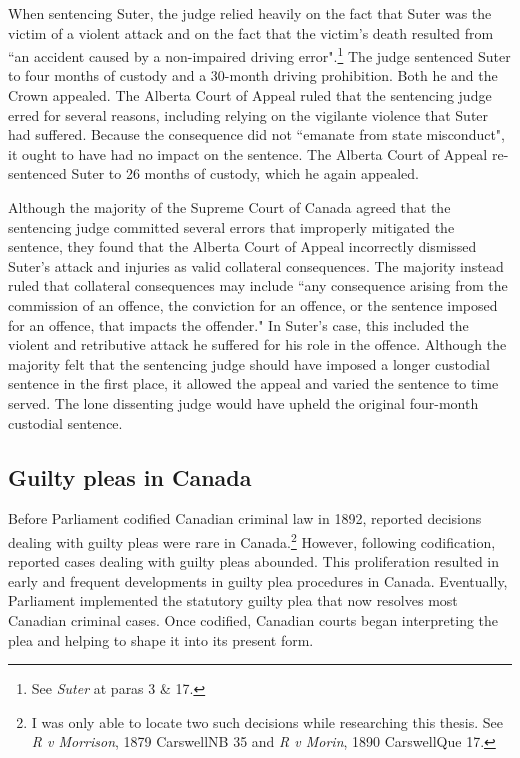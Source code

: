 When sentencing Suter, the judge relied heavily on the fact that Suter was the victim of a violent attack and on the fact that the victim's death resulted from ``an accident caused by a non-impaired driving error".\footnote{See \textit{Suter} at paras 3 \& 17.} The judge sentenced Suter to four months of custody and a 30-month driving prohibition. Both he and the Crown appealed. The Alberta Court of Appeal ruled that the sentencing judge erred for several reasons, including relying on the vigilante violence that Suter had suffered. Because the consequence did not ``emanate from state misconduct", it ought to have had no impact on the sentence. The Alberta Court of Appeal re-sentenced Suter to 26 months of custody, which he again appealed. 

Although the majority of the Supreme Court of Canada agreed that the sentencing judge committed several errors that improperly mitigated the sentence, they found that the Alberta Court of Appeal incorrectly dismissed Suter's attack and injuries as valid collateral consequences. The majority instead ruled that collateral consequences may include ``any consequence arising from the commission of an offence, the conviction for an offence, or the sentence imposed for an offence, that impacts the offender." In Suter's case, this included the violent and retributive attack he suffered for his role in the offence. Although the majority felt that the sentencing judge should have imposed a longer custodial sentence in the first place, it allowed the appeal and varied the sentence to time served. The lone dissenting judge would have upheld the original four-month custodial sentence.

\subsection{Guilty pleas in Canada}

Before Parliament codified Canadian criminal law in 1892, reported decisions dealing with guilty pleas were rare in Canada.\footnote{I was only able to locate two such decisions while researching this thesis. See \textit{R v Morrison}, 1879 CarswellNB 35 and \textit{R v Morin}, 1890 CarswellQue 17.} However, following codification, reported cases dealing with guilty pleas abounded. This proliferation resulted in early and frequent developments in guilty plea procedures in Canada. Eventually, Parliament implemented the statutory guilty plea that now resolves most Canadian criminal cases. Once codified, Canadian courts began interpreting the plea and helping to shape it into its present form.

